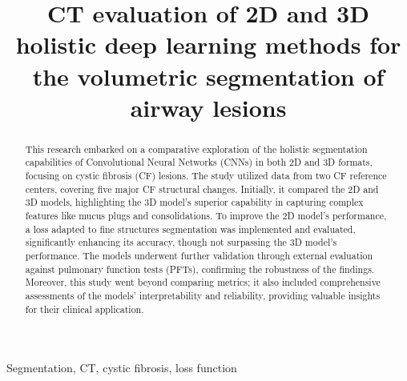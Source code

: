 \documentclass{article}
\begin{document}
\def\x{{\mathbf x}}
\def\L{{\cal L}}

\title{CT evaluation of 2D and 3D holistic deep learning methods for the  volumetric segmentation of airway lesions}


\address{$^1$Univ. Bordeaux, INSERM, CRCTB, U 1045, F-33000 Bordeaux, France \\ 
         $^2$Univ. Bordeaux, CNRS, Bordeaux INP, IMB, UMR 5251, F-33400 Talence, France\\
         $^3$Univ. Bordeaux, CNRS, Bordeaux INP, LaBRI, UMR 5800, F-33400 Talence, France \\
         $^4$Service d’Imagerie Médicale Radiologie Diagnostique et Thérapeutique, CHU de Bordeaux, France       
         }

%

%
\maketitle
%

\begin{abstract}
This research embarked on a comparative exploration of the holistic segmentation capabilities of Convolutional Neural Networks (CNNs) in both 2D and 3D formats, focusing on cystic fibrosis (CF) lesions. The study utilized data from two CF reference centers, covering five major CF structural changes. Initially, it compared the 2D and 3D models, highlighting the 3D model's superior capability in capturing complex features like mucus plugs and consolidations. To improve the 2D model's performance, a loss adapted to fine structures segmentation was implemented and evaluated, significantly enhancing its accuracy, though not surpassing the 3D model's performance. The models underwent further validation through external evaluation against pulmonary function tests (PFTs), confirming the robustness of the findings. Moreover, this study went beyond comparing metrics; it also included comprehensive assessments of the models' interpretability and reliability, providing valuable insights for their clinical application.


\end{abstract}
%
\begin{keywords}
Segmentation, CT, cystic fibrosis, loss function

\end{keywords}
\end{document}

